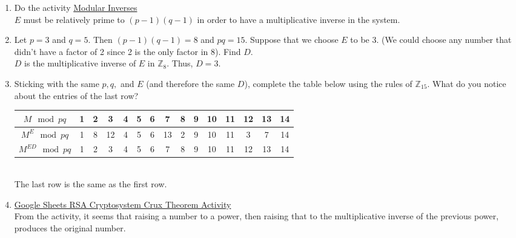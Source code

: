 \documentclass{article}
\begin{document}
\begin{enumerate}
    \item Do the activity \href{https://docs.google.com/spreadsheets/d/1vwZHtPWf8RX4x7-8a8qORGgtC9CZb5UV/edit?usp=sharing&ouid=103144376998261263253&rtpof=true&sd=true}{Modular Inverses}\\
          $E$ must be relatively prime to $(p-1)(q-1)$ in order to have a multiplicative inverse in the system.
    \item Let $p=3$ and $q=5$. Then $(p-1)(q-1) = 8$ and $pq = 15$. Suppose that we choose $E$ to be 3. (We could choose any number that didn’t have a factor of 2 since 2 is the only factor in 8). Find $D$.\\
          $D$ is the multiplicative inverse of $E$ in $\mathbb{Z}_{8}$. Thus, $D = 3$.
    \item Sticking with the same $p, q,$ and $E$ (and therefore the same $D$), complete the table below using the rules of $\mathbb{Z}_{15}$. What do you notice about the entries of the last row?\\
          \begin{tabular}{|c||c|c|c|c|c|c|c|c|c|c|c|c|c|c|}
              \hline
              $M \mod{pq}$      & 1 & 2 & 3  & 4 & 5 & 6 & 7  & 8 & 9 & 10 & 11 & 12 & 13 & 14 \\
              \hline
              \hline
              $M^{E} \mod{pq}$  & 1 & 8 & 12 & 4 & 5 & 6 & 13 & 2 & 9 & 10 & 11 & 3  & 7  & 14 \\
              \hline
              $M^{ED} \mod{pq}$ & 1 & 2 & 3  & 4 & 5 & 6 & 7  & 8 & 9 & 10 & 11 & 12 & 13 & 14 \\
              \hline
          \end{tabular}\\
          The last row is the same as the first row.
    \item \href{https://docs.google.com/spreadsheets/d/1TyXS6F61i7I05NOypTlqcOyrf-DUD3SJwcPTzKUEWaU/edit?usp=sharing}{Google Sheets RSA Cryptosystem Crux Theorem Activity}\\
          From the activity, it seems that raising a number to a power, then raising that to the multiplicative inverse of the previous power, produces the original number.
\end{enumerate}
\end{document}
